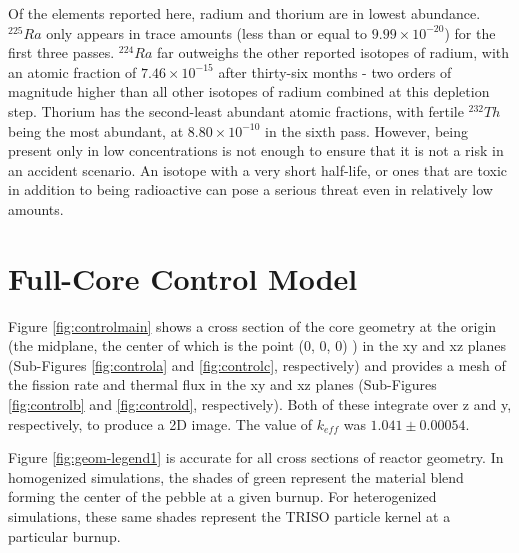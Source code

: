 Of the elements reported here, radium and thorium are in lowest abundance.  $^{225}Ra$ only appears in trace amounts (less than or equal to $9.99\times10^{-20}$) for the first three passes.  $^{224}Ra$ far outweighs the other reported isotopes of radium, with an atomic fraction of $7.46\times10^{-15}$ after thirty-six months - two orders of magnitude higher than all other isotopes of radium combined at this depletion step.  Thorium has the second-least abundant atomic fractions, with fertile $^{232}Th$ being the most abundant, at $8.80\times10^{-10}$ in the sixth pass.  However, being present only in low concentrations is not enough to ensure that it is not a risk in an accident scenario.  An isotope with a very short half-life, or ones that are toxic in addition to being radioactive can pose a serious threat even in relatively low amounts.

\section{Full-Core Control Model}
\label{res-control}

Figure \ref{fig:controlmain} shows a cross section of the core geometry at the origin (the midplane, the center of which is the point (0, 0, 0) ) in the xy and xz planes (Sub-Figures \ref{fig:controla} and \ref{fig:controlc}, respectively) and provides a mesh of the fission rate and thermal flux in the xy and xz planes (Sub-Figures \ref{fig:controlb} and \ref{fig:controld}, respectively).  Both of these integrate over z and y, respectively, to produce a 2D image.  The value of $k_{eff}$ was $1.041 \pm 0.00054$.

Figure \ref{fig:geom-legend1} is accurate for all cross sections of reactor geometry.  In homogenized simulations, the shades of green represent the material blend forming the center of the pebble at a given burnup.  For heterogenized simulations, these same shades represent the TRISO particle kernel at a particular burnup.



